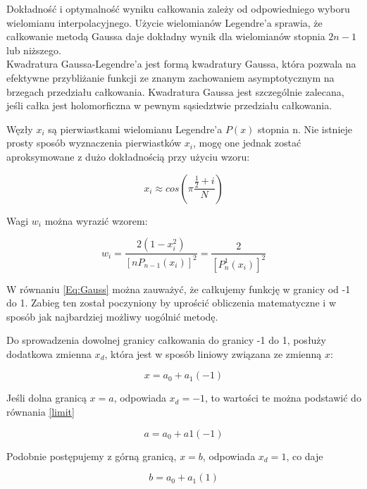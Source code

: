 \documentclass[12pt,twoside]{article}
\begin{document}
Dokładność i optymalność wyniku całkowania zależy od odpowiedniego wyboru wielomianu interpolacyjnego. Użycie wielomianów Legendre'a sprawia, że całkowanie metodą Gaussa daje dokładny wynik dla wielomianów stopnia $2n-1$ lub niższego. \\

Kwadratura Gaussa-Legendre'a jest formą kwadratury Gaussa, która pozwala na efektywne przybliżanie funkcji ze znanym zachowaniem asymptotycznym na brzegach przedziału całkowania. Kwadratura Gaussa jest szczególnie zalecana, jeśli całka jest holomorficzna w pewnym sąsiedztwie przedziału całkowania.

Węzły $x_i$ są pierwiastkami wielomianu Legendre'a $P(x)$ stopnia n. Nie istnieje prosty sposób wyznaczenia pierwiastków $x_i$, mogę one jednak zostać aproksymowane z dużo dokładnością przy użyciu wzoru:

\begin{equation}
x_i \approx cos(\pi \frac{\frac{1}{2}+i}{N})
\label{nodes}
\end{equation}

Wagi $w_i$ można wyrazić wzorem:

\begin{equation}
w_i = \frac{2(1-x_i^2)}{[nP_{n-1}(x_i)]^2} = \frac{2}{[P_n^1(x_i)]^2}
\label{Eq:rownanie}
\end{equation}\cite{Lagrange}

W równaniu \eqref{Eq:Gauss} można zauważyć, że całkujemy funkcję w granicy od -1 do 1. Zabieg ten został poczyniony by uprościć obliczenia matematyczne i w sposób jak najbardziej możliwy uogólnić metodę. 

Do sprowadzenia dowolnej granicy całkowania do granicy -1 do 1, posłuży dodatkowa zmienna $x_d$, która jest w sposób liniowy związana ze zmienną $x$:

\begin{equation}
x = a_0 + a_1(-1)
\label{limit}
\end{equation}

Jeśli dolna granicą $x = a$, odpowiada $x_d = -1$, to wartości te można podstawić do równania \eqref{limit}

\begin{equation}
a = a_0 + a1(-1)
\label{x}
\end{equation} 

Podobnie postępujemy z górną granicą, $x = b$, odpowiada $x_d = 1$, co daje 

\begin{equation}
b = a_0 + a_1(1)
\label{y}
\end{equation}
\end{document}
